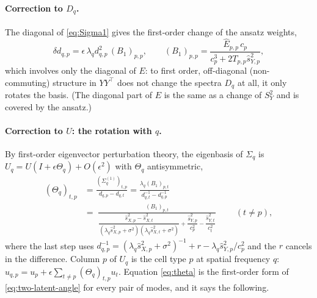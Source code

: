 \documentclass[11pt,a4paper]{article}
\begin{document}
\paragraph{Correction to $D_q$.}
The diagonal of \eqref{eq:Sigma1} gives the first-order change of the ansatz weights,
\begin{equation}
  \delta d_{q,p} = \epsilon\,\lambda_q d_{q,p}^2\,(B_1)_{p,p},\qquad
  (B_1)_{p,p} = \frac{\hat E_{p,p}\,c_p}{c_p^3 + 2T_{p,p}\hat s_{Y,p}^2},
\end{equation}
which involves only the diagonal of $E$: to first order, off-diagonal (non-commuting) structure in $YY^\top$ does not change the spectra $D_q$ at all, it only rotates the basis. (The diagonal part of $E$ is the same as a change of $S_Y^2$ and is covered by the ansatz.)

\paragraph{Correction to $U$: the rotation with $q$.}
By first-order eigenvector perturbation theory, the eigenbasis of $\Sigma_q$ is $U_q = U(I + \epsilon\Theta_q) + O(\epsilon^2)$ with $\Theta_q$ antisymmetric,
\begin{equation}
\begin{aligned}
  (\Theta_q)_{t,p} &= \frac{(\Sigma_q^{(1)})_{t,p}}{d_{q,p} - d_{q,t}}
  = \frac{\lambda_q (B_1)_{p,t}}{d_{q,t}^{-1} - d_{q,p}^{-1}} \\[1ex]
  &= \boxed{\;\frac{(B_1)_{p,t}}{\dfrac{\hat s_{X,p}^2 - \hat s_{X,t}^2}{(\lambda_q\hat s_{X,p}^2 + \sigma^2)(\lambda_q\hat s_{X,t}^2 + \sigma^2)} + \dfrac{\hat s_{Y,p}^2}{c_p^2} - \dfrac{\hat s_{Y,t}^2}{c_t^2}}\;}
  \qquad (t \ne p),
\end{aligned}
  \label{eq:theta}
\end{equation}
where the last step uses $d_{q,p}^{-1} = (\lambda_q\hat s_{X,p}^2+\sigma^2)^{-1} + r - \lambda_q\hat s_{Y,p}^2/c_p^2$ and the $r$ cancels in the difference. Column $p$ of $U_q$ is the cell type $p$ at spatial frequency $q$: $u_{q,p} = u_p + \epsilon\sum_{t\ne p}(\Theta_q)_{t,p}u_t$. Equation \eqref{eq:theta} is the first-order form of \eqref{eq:two-latent-angle} for every pair of modes, and it says the following.
\end{document}
